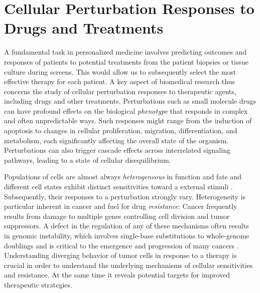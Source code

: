 \section{Cellular Perturbation Responses to Drugs and Treatments}
\label{sec:cell_perturbation_responses}

A fundamental task in personalized medicine involves predicting outcomes and responses of patients to potential treatments from the patient biopsies or tissue culture during screens. This would allow us to subsequently select the most effective therapy for each patient.
A key aspect of biomedical research thus concerns the study of cellular perturbation responses to therapeutic agents, including drugs and other treatments.
Perturbations such as small molecule drugs can have profound effects on the biological \emph{phenotype} that responds in complex and often unpredictable ways.
Such responses might range from the induction of apoptosis to changes in cellular proliferation, migration, differentiation, and metabolism, each significantly affecting the overall state of the organism. 
Perturbations can also trigger cascade effects across interrelated signaling pathways, leading to a state of cellular disequilibrium.

Populations of cells are almost always \emph{heterogeneous} in function and fate and different cell states exhibit distinct sensitivities toward a external stimuli \citep{spiller2010measurement}.
Subsequently, their responses to a perturbation strongly vary.
Heterogeneity is particular inherent in cancer and fuel for drug \emph{resistance}: 
Cancer frequently results from damage to multiple genes controlling cell division and tumor suppressors.
A defect in the regulation of any of these mechanisms often results in genomic instability, which involves single-base substitutions to whole-genome doublings and
is critical to the emergence and progression of many cancers \citep{dagogo2018tumour}. Understanding diverging behavior of tumor cells in response to a therapy is crucial in order to understand the underlying mechanisms of cellular sensitivities and resistance.
At the same time it reveals potential targets for improved therapeutic strategies.


